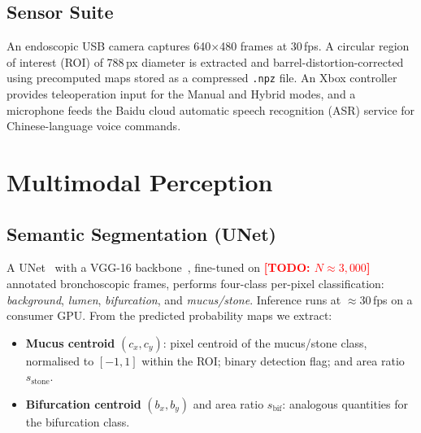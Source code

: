 \documentclass[journal,comsoc]{IEEEtran}
\newcommand{\TODO}[1]{\textcolor{red}{\textbf{[TODO: #1]}}}
\begin{document}
\subsection{Sensor Suite}
An endoscopic USB camera captures 640$\times$480 frames at 30\,fps.
A circular region of interest (ROI) of 788\,px diameter is extracted
and barrel-distortion-corrected using precomputed maps stored as a
compressed \texttt{.npz} file. An Xbox controller provides
teleoperation input for the Manual and Hybrid modes, and a microphone
feeds the Baidu cloud automatic speech recognition (ASR) service for
Chinese-language voice commands.

\section{Multimodal Perception}
\label{sec:perception}

\subsection{Semantic Segmentation (UNet)}
A UNet~\cite{ronneberger2015unet} with a VGG-16
backbone~\cite{simonyan2014vgg}, fine-tuned on
\TODO{$N\!\approx\!3{,}000$} annotated bronchoscopic frames, performs
four-class per-pixel classification: \textit{background},
\textit{lumen}, \textit{bifurcation}, and \textit{mucus/stone}.
Inference runs at $\approx$30\,fps on a consumer GPU. From the
predicted probability maps we extract:
\begin{itemize}[leftmargin=*,topsep=1pt,itemsep=0pt]
  \item \textbf{Mucus centroid} $(c_x, c_y)$: pixel centroid of the
        mucus/stone class, normalised to $[-1,1]$ within the ROI;
        binary detection flag; and area ratio $s_\text{stone}$.
  \item \textbf{Bifurcation centroid} $(b_x, b_y)$ and area ratio
        $s_\text{bif}$: analogous quantities for the bifurcation
        class.
\end{itemize}
\end{document}
